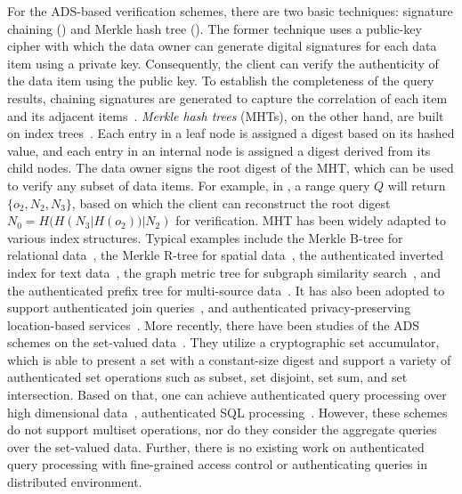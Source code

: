For the ADS-based verification schemes, there are two basic techniques: signature chaining () and Merkle hash tree (). The former technique uses a public-key cipher with which the data owner can generate digital signatures for each data item using a private key. Consequently, the client can verify the authenticity of the data item using the public key. To establish the completeness of the query results, chaining signatures are generated to capture the correlation of each item and its adjacent items~\cite{10.1109/ICDE.2004.1320027}. \emph{Merkle hash trees} (MHTs), on the other hand, are built on index trees~\cite{10.1007/0-387-34805-0_21}. Each entry in a leaf node is assigned a digest based on its hashed value, and each entry in an internal node is assigned a digest derived from its child nodes. The data owner signs the root digest of the MHT, which can be used to verify any subset of data items. For example, in , a range query $Q$ will return $\{o_2, N_2, N_3\}$, based on which the client can reconstruct the root digest $N_0 = H( H(N_3 | H(o_2))| N_2)$ for verification. MHT has been widely adapted to various index structures. Typical examples include the Merkle B-tree for relational data~\cite{10.1145/1142473.1142488}, the Merkle R-tree for spatial data~\cite{10.1007/s00778-008-0113-2,10.1109/icde.2011.5767829}, the authenticated inverted index for text data~\cite{10.14778/1453856.1453875}, the graph metric tree for subgraph similarity search~\cite{10.1109/tkde.2014.2316818}, and the authenticated prefix tree for multi-source data~\cite{10.1145/2723372.2747649}. It has also been adopted to support authenticated join queries~\cite{10.1145/1559845.1559849}, and authenticated privacy-preserving location-based services~\cite{10.1145/2213836.2213871,10.1109/icde.2013.6544932,10.14778/2732219.2732224}. More recently, there have been studies of the ADS schemes on the set-valued data~\cite{10.1007/978-3-642-22792-9_6,10.1007/978-3-642-54631-0_7,10.1109/eurosp.2017.35}. They utilize a cryptographic set accumulator, which is able to present a set with a constant-size digest and support a variety of authenticated set operations such as subset, set disjoint, set sum, and set intersection. Based on that, one can achieve authenticated query processing over high dimensional data~\cite{10.1145/2660267.2660373}, authenticated SQL processing~\cite{10.1145/2810103.2813711}. However, these schemes do not support multiset operations, nor do they consider the aggregate queries over the set-valued data. Further, there is no existing work on authenticated query processing with fine-grained access control or authenticating queries in distributed environment.

